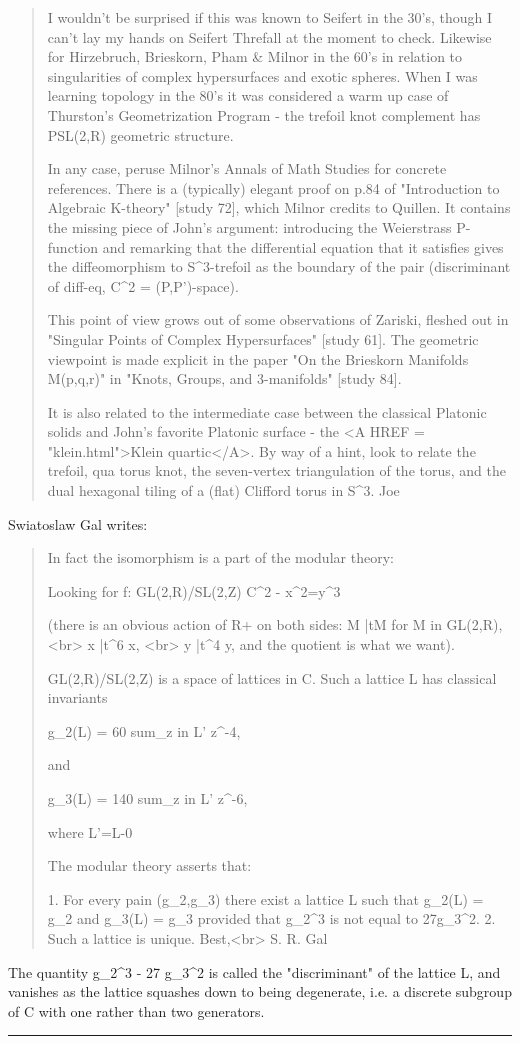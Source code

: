 \begin{quote}
  I wouldn't be surprised if this was known to Seifert in the 30's,
  though I can't lay my hands on Seifert \text{\&}  Threfall at the moment to
  check. Likewise for Hirzebruch, Brieskorn, Pham & Milnor in the 60's in
  relation to singularities of complex hypersurfaces and exotic spheres.
  When I was learning topology in the 80's it was considered a warm up
  case of Thurston's Geometrization Program - the trefoil knot complement
  has PSL(2,R) geometric structure.

  In any case, peruse Milnor's Annals of Math Studies for concrete
  references. There is a (typically) elegant proof on p.84 of
  "Introduction to Algebraic K-theory" [study 72], which Milnor credits 
  to Quillen. It contains the missing piece of John's argument:
  introducing the Weierstrass P-function and remarking that the
  differential equation that it satisfies gives the diffeomorphism to
  S^{3}-trefoil as the boundary of the pair (discriminant of diff-eq, 
  C^{2} = (P,P')-space).

  This point of view grows out of some observations of Zariski, fleshed
  out in "Singular Points of Complex Hypersurfaces" [study 61]. The
  geometric viewpoint is made explicit in the paper "On the Brieskorn
  Manifolds M(p,q,r)" in "Knots, Groups, and 3-manifolds" [study 84].

  It is also related to the intermediate case between the classical
  Platonic solids and John's favorite Platonic surface - the 
  <A HREF = "klein.html">Klein quartic</A>.  By way of a hint, look to
  relate the trefoil, qua torus knot, the seven-vertex triangulation of
  the torus, and the dual hexagonal tiling of a (flat) Clifford torus in 
  S^{3}.
  Joe
\end{quote}

Swiatoslaw Gal writes:

\begin{quote}
  In fact the isomorphism is a part of the modular theory:

  Looking for
  f: GL(2,R)/SL(2,Z) \to  C^{2} - {x^{2}=y^{3}}

  (there is an obvious action of R+ on both sides:
 M |\to  tM for M in  GL(2,R),<br>
  x |\to  t^{6} x, <br> y |\to  t^{4} y,
   and the quotient is what we want).

  GL(2,R)/SL(2,Z) is a space of lattices in C.
  Such a lattice L has classical invariants

  g_{2}(L) =  60 sum_{z in L'} z^{-4}, 

  and

   g_{3}(L) = 140 sum_{z in L'} z^{-6},
  
  where L'=L-{0}

  The modular theory asserts that:

  1. For every pain (g_{2},g_{3}) there exist a
     lattice L such that g_{2}(L) = g_{2} and
     g_{3}(L) = g_{3} provided that
     g_{2}^{3} is not equal to
     27g_{3}^{2}.
  2. Such a lattice is unique.
  Best,<br>
  S. R. Gal
\end{quote} 

The quantity g_{2}^{3} - 27
g_{3}^{2} is called the "discriminant" of the
lattice L, and vanishes as the lattice squashes down to being
degenerate, i.e. a discrete subgroup of C with one rather than two
generators.

\par\noindent\rule{\textwidth}{0.4pt}
